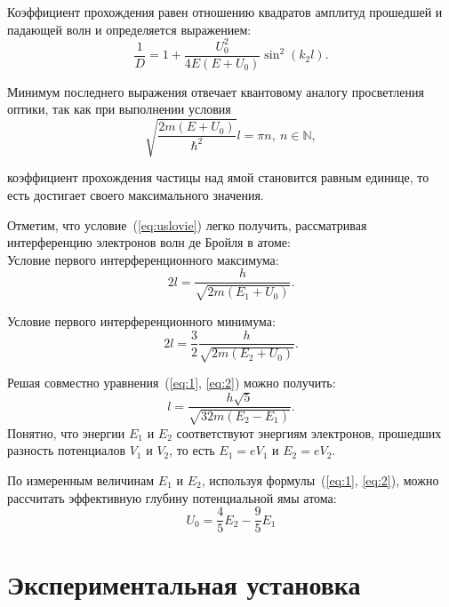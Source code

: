 \documentclass[a4paper, 12pt]{article}
\begin{document}
        Коэффициент прохождения равен отношению квадратов амплитуд прошедшей и падающей волн и определяется выражением:
        	\begin{equation}
        		\frac{1}{D} = 1 + \frac{U_0^2}{4E(E+U_0)}\sin^2(k_2l).
        	\end{equation}

        Минимум последнего выражения отвечает квантовому аналогу просветления оптики, так как при выполнении условия
        \begin{equation}
            \sqrt{\frac{2m(E+U_0)}{\hbar^2}}l = \pi n, \ n\in\mathbb{N},
            \label{eq:uslovie}
        \end{equation}

        коэффициент прохождения частицы над ямой становится равным единице, то есть достигает своего максимального значения.

        Отметим, что условие~(\ref{eq:uslovie}) легко получить, рассматривая интерференцию электронов волн де Бройля в атоме:\\
        Условие первого интерференционного максимума:
        \begin{equation}
            \label{eq:1}
            2l = \frac{h}{\sqrt{2m(E_1+U_0)}}.
        \end{equation}

        Условие первого интерференционного минимума:
        \begin{equation}
            \label{eq:2}
            2l =\frac{3}{2} \frac{h}{\sqrt{2m(E_2+U_0)}}.
        \end{equation}

        	Решая совместно уравнения~(\ref{eq:1}, \ref{eq:2}) можно получить:
        	\begin{equation}
        		\label{eq:3}
        		l = \frac{h\sqrt{5}}{\sqrt{32m(E_2-E_1)}}.
        	\end{equation}
        	Понятно, что энергии $E_1$ и $E_2$ соответствуют энергиям электронов, прошедших разность потенциалов $V_1$ и $V_2$, то есть $E_1 = eV_1$ и $E_2 = eV_2$.

        	По измеренным величинам $E_1$ и $E_2$, используя формулы~(\ref{eq:1}, \ref{eq:2}), можно рассчитать эффективную глубину потенциальной ямы атома:
        	\begin{equation}
        		\label{eq:U_0}
        		U_0 = \frac{4}{5}E_2 - \frac{9}{5}E_1
        	\end{equation}

        \section{Экспериментальная установка}
\end{document}
